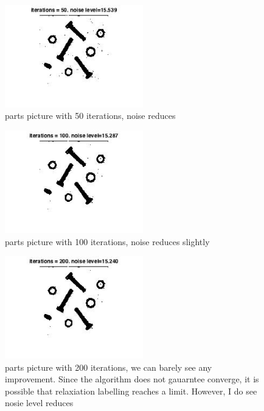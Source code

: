 \documentclass[twoside]{article}
\theoremstyle{definition}
\theoremstyle{definition}
\theoremstyle{remark}
\begin{document}
\begin{figure}[H]
\centering
\includegraphics[width=60mm]{50_parts.jpg}
\caption{parts  picture with 50 iterations, noise reduces}
\end{figure}

\begin{figure}[H]
\centering
\includegraphics[width=60mm]{100_parts.jpg}
\caption{parts  picture with 100 iterations, noise reduces slightly}
\end{figure}

\begin{figure}[H]
\centering
\includegraphics[width=60mm]{200_parts.jpg}
\caption{parts  picture with 200 iterations, we can barely see any improvement. Since the algorithm does not gauarntee converge, it is possible that relaxiation labelling reaches a limit. However, I do see nosie level reduces}
\end{figure}
\end{document}
